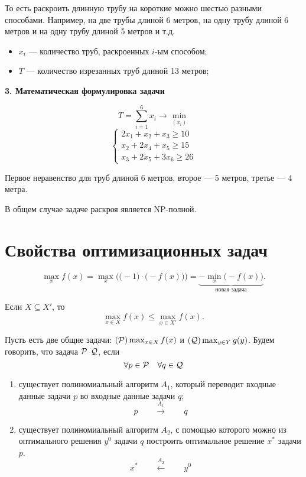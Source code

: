 То есть раскроить длинную трубу на короткие можно шестью разными способами. Например, на две трубы длиной 6 метров, на одну трубу длиной 6 метров и на одну трубу длиной 5 метров и т.д.

\begin{itemize}
	\item $x_i$ --- количество труб, раскроенных $i$-ым способом;
	
	\item $T$ --- количество изрезанных труб длиной 13 метров;
\end{itemize}

\textbf{3. Математическая формулировка задачи}

\[
	T = \sum_{i=1}^6 x_i \to \min_{(x_i)}
\]
\[
	\begin{cases}
		2x_1 + x_2 + x_3 \ge 10 \\
		x_2 + 2x_4 + x_5 \ge 15 \\
		x_3 + 2x_5 + 3x_6 \ge 26
	\end{cases}
\]

Первое неравенство для труб длиной 6 метров, второе --- 5 метров, третье --- 4 метра.

\remark

В общем случае задаче раскроя является NP-полной.

\section{Свойства оптимизационных задач}

\fact

\[
	\max_x f(x) = \max_x \Big(\big(-1\big) \cdot \big(-f(x)\big)\Big) = \underbrace{-\min_x \big(-f(x)\big)}_{\text{новая задача}}.
\]


Если $X \subseteq X'$, то
\[
	\max_{x \in X} f(x) \le \max_{x \in X'} f(x).
\]


Пусть есть две общие задачи: $(\P) \max_{x \in X} f(x)$ и $(\Q) \max_{y \in Y} g(y)$. Будем говорить, что задача $\P$  $\Q$, если
\[
	\forall p \in \P \quad \forall q \in \Q
\]

\begin{enumerate}[nosep]
	\item существует полиномиальный алгоритм $A_1$, который переводит входные данные задачи $p$ во входные данные задачи $q$;
	\[
		p \qquad \stackrel{A_1}{\longrightarrow} \qquad q
	\]
	
	\item существует полиномиальный алгоритм $A_2$, с помощью которого можно из оптимального решения $y^0$ задачи $q$ построить оптимальное решение $x^*$ задачи $p$.
	\[
		x^* \qquad \stackrel{A_2}{\longleftarrow} \qquad y^0
	\]
\end{enumerate}

